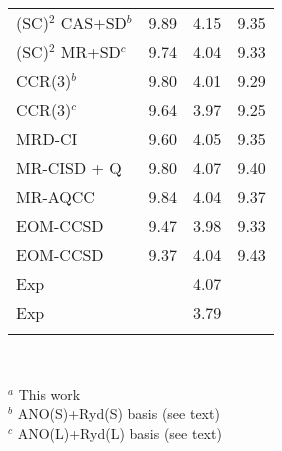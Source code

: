 \documentclass[global,referee]{svjour}
\begin{document}
\begin{table}[h]
\begin{tabular}{lccc}
(SC)$^2$ CAS+SD$^b$ \cite{Ruiz03}
                        &  9.89  & 4.15  & 9.35  \\
(SC)$^2$ MR+SD$^c$ \cite{Ruiz03}
                        &  9.74  & 4.04  & 9.33  \\
CCR(3)$^b$ \cite{Ruiz03}
                        &  9.80  & 4.01  & 9.29  \\
CCR(3)$^c$ \cite{Ruiz03}
                        &  9.64  & 3.97  & 9.25  \\
MRD-CI \cite{Hachey95}
                        &  9.60  & 4.05  & 9.35  \\
MR-CISD + Q \cite{Muller01}
                        &  9.80  & 4.07  & 9.40  \\
MR-AQCC  \cite{Muller01}
                        &  9.84  & 4.04  & 9.37  \\
EOM-CCSD \cite{gwalt95} &  9.47  & 3.98  & 9.33  \\
EOM-CCSD \cite{Wiberg02}&  9.37  & 4.04  & 9.43  \\
Exp \cite{Robin85}      &        & 4.07  &       \\
Exp \cite{Walzl87}      &        & 3.79  &       \\
\noalign{\smallskip}\hline
\end{tabular}\\
{\smallskip}

$^a$  This work\\
$^b$  ANO(S)+Ryd(S) basis (see text)\\
$^c$  ANO(L)+Ryd(L) basis (see text)\\
\end{table}
\end{document}
